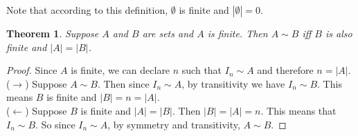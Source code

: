 \documentclass{report}
\newtheorem*{theorem}{Theorem}
\theoremstyle{definition}
\begin{document}
Note that according to this definition, $\emptyset$ is finite and $|\emptyset|=0$.
\begin{theorem}
Suppose $A$ and $B$ are sets and $A$ is finite. Then
$A\sim B$ iff $B$ is also finite and $|A|=|B|$.
\end{theorem}
\begin{proof}
Since $A$ is finite, we can declare $n$ such that $I_n\sim A$ and therefore $n=|A|$.\\
\indent($\rightarrow$) Suppose $A\sim B$. Then since $I_n\sim A$, by transitivity we have $I_n\sim B$. This means 
$B$ is finite and $|B|=n=|A|$.\\
\indent($\leftarrow$) Suppose $B$ is finite and $|A|=|B|$.
Then $|B|=|A|=n$. This means that $I_n\sim B$. So since $I_n\sim A$, by
symmetry and transitivity, $A\sim B$.
\end{proof}
\newpage
\end{document}
